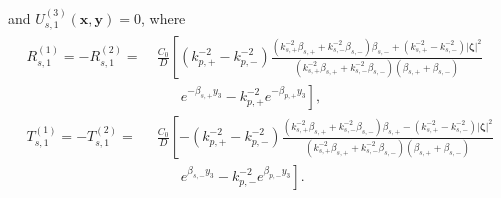 \documentclass[final,reqno]{siamltex}
\newcommand{\ben}{\begin{eqnarray*}}
\newcommand{\enn}{\end{eqnarray*}}
\begin{document}
and $U_{s,1}^{(3)}(\mathbf{x},\mathbf{y})=0$, where 
\ben
  \begin{aligned}
  	R_{s,1}^{(1)}=-R_{s,1}^{(2)}=&\;\frac{C_0}{D}\left[(k_{p,+}^{-2}-k_{p,-}^{-2})\frac{(k_{s,+}^{-2}\beta_{s,+}+k_{s,-}^{-2}\beta_{s,-})\beta_{s,-}+(k_{s,+}^{-2}-k_{s,-}^{-2})|\boldsymbol{\zeta}|^2}{(k_{s,+}^{-2}\beta_{s,+}+k_{s,-}^{-2}\beta_{s,-})(\beta_{s,+}+\beta_{s,-})}\right. \\
  &\qquad\left.e^{-\beta_{s,+}y_3}-k_{p,+}^{-2}e^{-\beta_{p,+}y_3}\right], \\
  T_{s,1}^{(1)}=-T_{s,1}^{(2)}=&\;\frac{C_0}{D}\left[-(k_{p,+}^{-2}-k_{p,-}^{-2})\frac{(k_{s,+}^{-2}\beta_{s,+}+k_{s,-}^{-2}\beta_{s,-})\beta_{s,+}-(k_{s,+}^{-2}-k_{s,-}^{-2})|\boldsymbol{\zeta}|^2}{(k_{s,+}^{-2}\beta_{s,+}+k_{s,-}^{-2}\beta_{s,-})(\beta_{s,+}+\beta_{s,-})}\right. \\
  &\qquad\left.e^{\beta_{s,-}y_3}-k_{p,-}^{-2}e^{\beta_{p,-}y_3}\right]. 
  \end{aligned}
\enn
\end{document}
